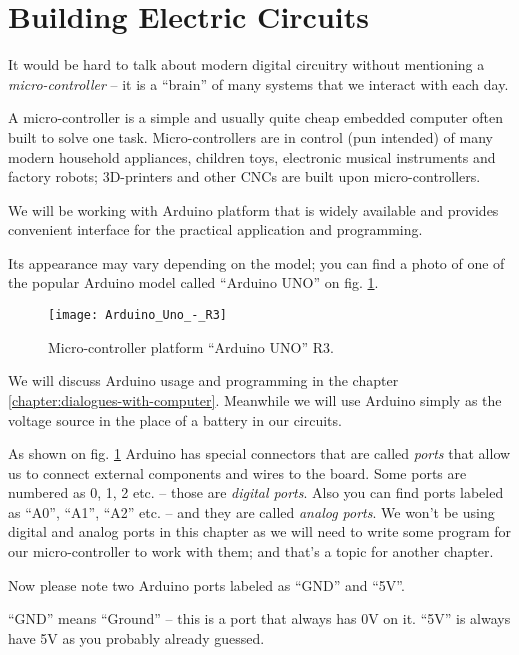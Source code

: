 \documentclass[../sparc.tex]{subfiles}
\begin{document}
\section{Building Electric Circuits}

It would be hard to talk about modern digital circuitry without mentioning a
\emph{micro-controller} -- it is a ``brain'' of many systems that we interact
with each day.

A micro-controller is a simple and usually quite cheap embedded computer often
built to solve one task.  Micro-controllers are in control (pun intended) of
many modern household appliances, children toys, electronic musical instruments
and factory robots; 3D-printers and other CNCs are built upon micro-controllers.

We will be working with Arduino platform that is widely available and provides
convenient interface for the practical application and programming.

Its appearance may vary depending on the model; you can find a photo of one of
the popular Arduino model called ``Arduino UNO'' on
fig. \ref{fig:arduino-uno-r3}.

\begin{figure}[ht]
  \centering
  \texttt{[image: Arduino\_Uno\_-\_R3]}
  \caption{Micro-controller platform ``Arduino UNO'' R3.}
  \label{fig:arduino-uno-r3}
\end{figure}

We will discuss Arduino usage and programming in the chapter
\ref{chapter:dialogues-with-computer}.  Meanwhile we will use Arduino simply as
the voltage source in the place of a battery in our circuits.

As shown on fig. \ref{fig:arduino-uno-r3} Arduino has special connectors that
are called \emph{ports} that allow us to connect external components and wires
to the board.  Some ports are numbered as 0, 1, 2 etc. -- those are \emph{digital
ports}.  Also you can find ports labeled as ``A0'', ``A1'', ``A2'' etc. -- and
they are called \emph{analog ports}.  We won't be using digital and analog ports
in this chapter as we will need to write some program for our micro-controller
to work with them; and that's a topic for another chapter.

Now please note two Arduino ports labeled as ``GND'' and ``5V''.

``GND'' means ``Ground'' -- this is a port that always has 0V on it.  ``5V'' is
always have 5V as you probably already guessed.
\end{document}
